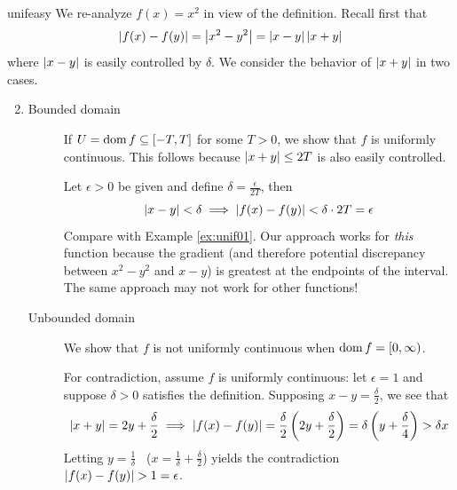\begin{examples}{}{unifeasy}
	\exstart We re-analyze $f(x)=x^2$ in view of the definition. Recall first that
	\[\left| f(x)-f(y)\right|=\left| x^2-y^2\right|=\left| x-y\right|\left| x+y\right|\]
	where $\left| x-y\right|$ is easily controlled by $\delta$. We consider the behavior of $\left| x+y\right|$ in two cases.
	\begin{enumerate}\setcounter{enumi}{1}
  \item[]\begin{description}
  	\item[Bounded domain] If $U=\operatorname{dom} f\subseteq [-T,T]$ for some $T>0$, we show that $f$ is uniformly continuous. This follows because $\left| x+y\right|\le 2T$ is also easily controlled.\par
  	Let $\epsilon>0$ be given and define $\delta =\frac\epsilon{2T}$, then
		\[\left| x-y\right|<\delta\implies \left| f(x)-f(y)\right|<\delta\cdot 2T=\epsilon\]
		Compare with Example \ref{ex:unif01}. Our approach works for \emph{this} function because the gradient (and therefore potential discrepancy between $x^2-y^2$ and $x-y$) is greatest at the endpoints of the interval. The same approach may not work for other functions!

		\item[Unbounded domain] We show that $f$ is not uniformly continuous when $\operatorname{dom} f=[0,\infty)$.\par	
		For contradiction, assume $f$ is uniformly continuous: let $\epsilon=1$ and suppose $\delta>0$ satisfies the definition. Supposing $x-y=\frac\delta 2$, we see that
		\[\left| x+y\right|=2y+\frac\delta 2 \implies	\left| f(x)-f(y)\right|=\frac\delta 2\left(2y+\frac\delta 2\right) =\delta\left(y+\frac\delta 4\right)>\delta x\]
		Letting $y=\frac 1\delta$ \ ($x=\frac 1\delta+\frac\delta 2$) yields the contradiction $\nm{f(x)-f(y)}>1=\epsilon$.
	\end{description}
	

\end{enumerate}
\end{examples}
